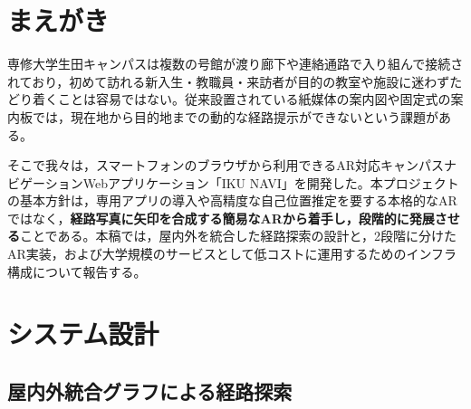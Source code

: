\documentclass[a4paper,10.5pt,twocolumn]{ltjsarticle}
\begin{document}

\section{まえがき}

専修大学生田キャンパスは複数の号館が渡り廊下や連絡通路で入り組んで接続されており，初めて訪れる新入生・教職員・来訪者が目的の教室や施設に迷わずたどり着くことは容易ではない。従来設置されている紙媒体の案内図や固定式の案内板では，現在地から目的地までの動的な経路提示ができないという課題がある。

そこで我々は，スマートフォンのブラウザから利用できるAR対応キャンパスナビゲーションWebアプリケーション「IKU NAVI」を開発した。本プロジェクトの基本方針は，専用アプリの導入や高精度な自己位置推定を要する本格的なARではなく，\textbf{経路写真に矢印を合成する簡易なARから着手し，段階的に発展させる}ことである。本稿では，屋内外を統合した経路探索の設計と，2段階に分けたAR実装，および大学規模のサービスとして低コストに運用するためのインフラ構成について報告する。

\section{システム設計}

\subsection{屋内外統合グラフによる経路探索}
\end{document}
